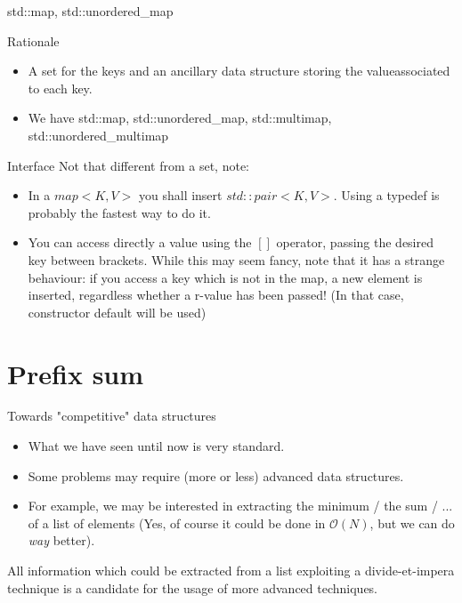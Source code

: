 \documentclass{beamer}
\begin{document}
\begin{frame}{std::map, std::unordered\_map}
\begin{block}{Rationale}
\begin{itemize}
\item A set for the keys and an ancillary data structure storing the valueassociated to each key.
\item We have std::map, std::unordered\_map, std::multimap, std::unordered\_multimap
\end{itemize}
\end{block}
\begin{block}{Interface}
Not that different from a set, note:
\begin{itemize}
\item In a $map<K, V>$ you shall insert $std::pair<K, V>$. Using a typedef is probably the fastest way to do it.
\item You can access directly a value using the $[ ]$ operator, passing the desired key between brackets. While this may seem fancy, note that it has a strange behaviour: if you access a key which is not in the map, a new element is inserted, regardless whether a r-value has been passed! (In that case, constructor default will be used)
\end{itemize}
\end{block}
\end{frame}


\section{Prefix sum}
\begin{frame}{Towards "competitive" data structures}
\begin{block}{}
\begin{itemize}
\item What we have seen until now is very standard.

\item Some problems may require (more or less) advanced data structures.

\item For example, we may be interested in extracting the minimum / the sum / ... of a list of elements (Yes, of course it could be done in $\mathcal{O}(N)$, but we can do \textit{way} better).
\end{itemize}
\end{block}

\begin{block}{}
All information which could be extracted from a list exploiting a divide-et-impera technique is a candidate for the usage of more advanced techniques.
\end{block}
\end{frame}
\end{document}
